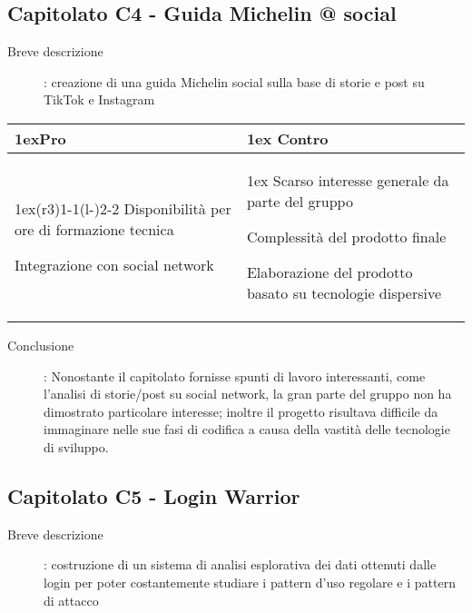 \subsection{Capitolato C4 - Guida Michelin @ social}
\begin{description}
\item [Breve descrizione]: creazione di una guida Michelin social sulla base di storie e post su TikTok e Instagram
\end{description}
\begin{table}[h]
\begin{tabularx}{\linewidth}{>{\parskip1ex}X@{\kern4\tabcolsep}>{\parskip1ex}X}
\hfil\bfseries Pro
&
\hfil\bfseries Contro
\\\cmidrule(r{3\tabcolsep}){1-1}\cmidrule(l{-\tabcolsep}){2-2}
Disponibilità per ore di formazione tecnica \par
Integrazione con social network 
&
Scarso interesse generale da parte del gruppo \par
Complessità del prodotto finale	\par
Elaborazione del prodotto basato su tecnologie dispersive \\
\end{tabularx}
\end{table}
\begin{description}
	\item [Conclusione]: Nonostante il capitolato fornisse spunti di lavoro interessanti, come l'analisi di storie/post su social network, la gran parte del gruppo non ha dimostrato particolare interesse; inoltre il progetto risultava difficile da immaginare nelle sue fasi di codifica a causa della vastità delle tecnologie di sviluppo.
\end{description}


\newpage

\subsection{Capitolato C5 - Login Warrior}
\begin{description}
\item [Breve descrizione]: costruzione di un sistema di analisi esplorativa dei dati ottenuti dalle login per poter costantemente studiare i pattern d’uso regolare e i pattern di attacco
\end{description}


